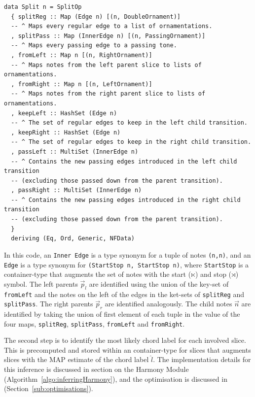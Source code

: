 \documentclass[12pt,a4paper,twoside,openany]{report} \usepackage[pdfborder={0 0 0}]{hyperref}    %
\theoremstyle{definition} \newtheorem{definition}{Definition}[section]
\begin{document}
    \begin{lstlisting}[caption={Split Operation}, captionpos=b] 
data Split n = SplitOp
  { splitReg :: Map (Edge n) [(n, DoubleOrnament)]
  -- ^ Maps every regular edge to a list of ornamentations.
  , splitPass :: Map (InnerEdge n) [(n, PassingOrnament)]
  -- ^ Maps every passing edge to a passing tone.
  , fromLeft :: Map n [(n, RightOrnament)]
  -- ^ Maps notes from the left parent slice to lists of ornamentations.
  , fromRight :: Map n [(n, LeftOrnament)]
  -- ^ Maps notes from the right parent slice to lists of ornamentations.
  , keepLeft :: HashSet (Edge n)
  -- ^ The set of regular edges to keep in the left child transition.
  , keepRight :: HashSet (Edge n)
  -- ^ The set of regular edges to keep in the right child transition.
  , passLeft :: MultiSet (InnerEdge n)
  -- ^ Contains the new passing edges introduced in the left child transition
  -- (excluding those passed down from the parent transition).
  , passRight :: MultiSet (InnerEdge n)
  -- ^ Contains the new passing edges introduced in the right child transition
  -- (excluding those passed down from the parent transition).
  }
  deriving (Eq, Ord, Generic, NFData)
    \end{lstlisting}

    In this code, an \texttt{Inner Edge} is a type synonym for a tuple of notes \texttt{(n,n)}, and an \texttt{Edge} is
    a type synonym for \texttt{(StartStop n, StartStop n)}, where \texttt{StartStop} is a container-type that augments
    the set of notes with the start ($\ltimes$) and stop ($\rtimes$) symbol. 
    The left parents $\vec{p}_l$ are identified using the union of the key-set of \texttt{fromLeft} and the notes on the left of the edges
    in the ket-sets of \texttt{splitReg} and \texttt{splitPass}. The right parents $\vec{p}_r$ are identified
    analogously. The child notes $\vec{n}$ are identified by taking the union of first element of each tuple in the value of
    the four maps, \texttt{splitReg}, \texttt{splitPass}, \texttt{fromLeft} and \texttt{fromRight}.

    The second step is to identify the most likely chord label for each involved slice. This is precomputed and stored
    within an container-type for slices that augments slices with the MAP estimate of the chord label $\hat{l}$. The implementation details for
    this inference is discussed in section on the Harmony Module (Algorithm~\ref{algo:inferringHarmony}), and the optimisation
    is discussed in (Section~\ref{sub:optimisations}). 
\end{document}
